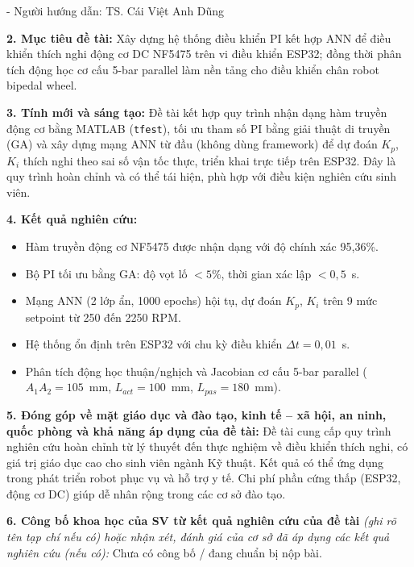 {\vspace{0.15cm}
\noindent- Người hướng dẫn: TS. Cái Việt Anh Dũng

\vspace{0.2cm}
\noindent\textbf{2. Mục tiêu đề tài:} Xây dựng hệ thống điều khiển PI kết hợp ANN để điều
khiển thích nghi động cơ DC NF5475 trên vi điều khiển ESP32; đồng thời phân tích động học
cơ cấu 5-bar parallel làm nền tảng cho điều khiển chân robot bipedal wheel.

\vspace{0.2cm}
\noindent\textbf{3. Tính mới và sáng tạo:} Đề tài kết hợp quy trình nhận dạng hàm truyền
động cơ bằng MATLAB (\texttt{tfest}), tối ưu tham số PI bằng giải thuật di truyền (GA) và
xây dựng mạng ANN từ đầu (không dùng framework) để dự đoán $K_p$, $K_i$ thích nghi theo
sai số vận tốc thực, triển khai trực tiếp trên ESP32. Đây là quy trình hoàn chỉnh và có
thể tái hiện, phù hợp với điều kiện nghiên cứu sinh viên.

\vspace{0.2cm}
\noindent\textbf{4. Kết quả nghiên cứu:}
\begin{itemize}[leftmargin=0.5cm, topsep=2pt, itemsep=0pt]
    \item Hàm truyền động cơ NF5475 được nhận dạng với độ chính xác 95,36\%.
    \item Bộ PI tối ưu bằng GA: độ vọt lố $<5\%$, thời gian xác lập $<0{,}5$~s.
    \item Mạng ANN (2 lớp ẩn, 1000 epochs) hội tụ, dự đoán $K_p$, $K_i$ trên 9 mức
    setpoint từ 250 đến 2250 RPM.
    \item Hệ thống ổn định trên ESP32 với chu kỳ điều khiển $\Delta t = 0{,}01$~s.
    \item Phân tích động học thuận/nghịch và Jacobian cơ cấu 5-bar parallel
    ($A_1A_2 = 105$~mm, $L_{act} = 100$~mm, $L_{pas} = 180$~mm).
\end{itemize}

\vspace{0.15cm}
\noindent\textbf{5. Đóng góp về mặt giáo dục và đào tạo, kinh tế -- xã hội, an ninh, quốc
phòng và khả năng áp dụng của đề tài:} Đề tài cung cấp quy trình nghiên cứu hoàn chỉnh từ
lý thuyết đến thực nghiệm về điều khiển thích nghi, có giá trị giáo dục cao cho sinh viên
ngành Kỹ thuật. Kết quả có thể ứng dụng trong phát triển robot phục vụ và hỗ trợ y tế. Chi
phí phần cứng thấp (ESP32, động cơ DC) giúp dễ nhân rộng trong các cơ sở đào tạo.

\vspace{0.15cm}
\noindent\textbf{6. Công bố khoa học của SV từ kết quả nghiên cứu của đề tài}
\textit{(ghi rõ tên tạp chí nếu có) hoặc nhận xét, đánh giá của cơ sở đã áp dụng các kết
quả nghiên cứu (nếu có):} Chưa có công bố / đang chuẩn bị nộp bài.

}
